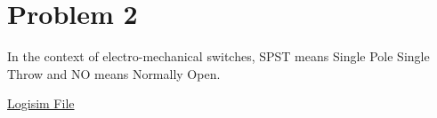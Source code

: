 \section*{Problem 2}
In the context of electro-mechanical switches, SPST means Single Pole Single Throw and NO means Normally Open.

\noindent
\href{https://raw.githubusercontent.com/lai-huy/CSCE-312/master/Lab\%203/Problem2.circ}{Logisim File}